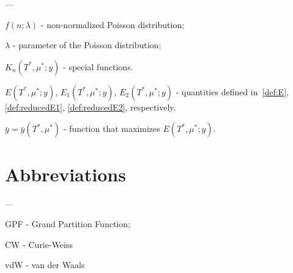 ---

$f(n; \lambda)$ - non-normalized Poisson distribution;

$\lambda$ - parameter of the Poisson distribution;

$K_n(T^*,\mu^*;y)$ - special functions.

$E(T^*,\mu^*;y)$, $E_1(T^*,\mu^*;y)$, $E_2(T^*,\mu^*;y)$ - quantities defined in~\eqref{def:E}, \eqref{def:reducedE1}, \eqref{def:reducedE2}, respectively.

$\bar{y} = \bar{y}(T^*,\mu^*)$ - function that maximizes $E(T^*,\mu^*;y)$.



\section*{Abbreviations}
---

GPF - Grand Partition Function;

CW - Curie-Weiss

vdW - van der Waals